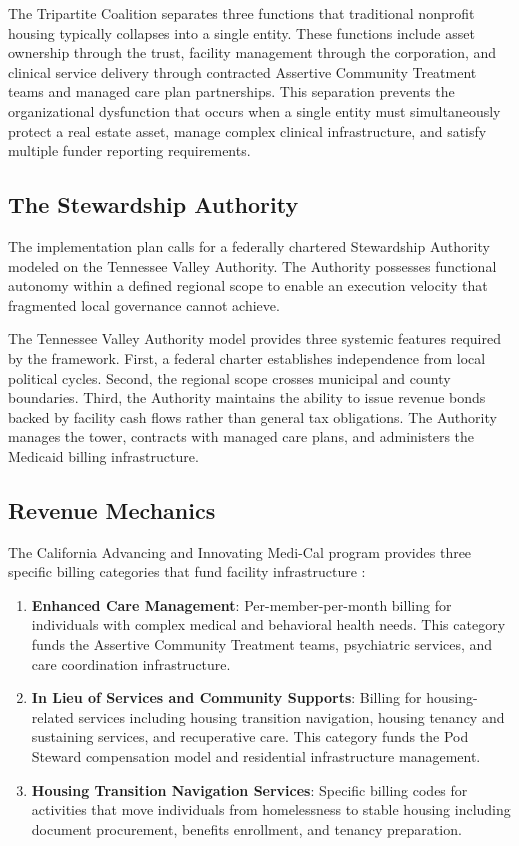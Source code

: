 \documentclass[12pt, letterpaper]{article}
\begin{document}
The Tripartite Coalition separates three functions that traditional nonprofit housing typically collapses into a single entity. These functions include asset ownership through the trust, facility management through the corporation, and clinical service delivery through contracted Assertive Community Treatment teams and managed care plan partnerships. This separation prevents the organizational dysfunction that occurs when a single entity must simultaneously protect a real estate asset, manage complex clinical infrastructure, and satisfy multiple funder reporting requirements.

\subsection{The Stewardship Authority}

The implementation plan calls for a federally chartered Stewardship Authority modeled on the Tennessee Valley Authority. The Authority possesses functional autonomy within a defined regional scope to enable an execution velocity that fragmented local governance cannot achieve.

The Tennessee Valley Authority model provides three systemic features required by the framework. First, a federal charter establishes independence from local political cycles. Second, the regional scope crosses municipal and county boundaries. Third, the Authority maintains the ability to issue revenue bonds backed by facility cash flows rather than general tax obligations. The Authority manages the tower, contracts with managed care plans, and administers the Medicaid billing infrastructure.

\subsection{Revenue Mechanics}

The California Advancing and Innovating Medi-Cal program provides three specific billing categories that fund facility infrastructure \citep{dhcs_calaim_2024, californiacoalition_2024}:

\begin{enumerate}
    \item \textbf{Enhanced Care Management}: Per-member-per-month billing for individuals with complex medical and behavioral health needs. This category funds the Assertive Community Treatment teams, psychiatric services, and care coordination infrastructure.
    \item \textbf{In Lieu of Services and Community Supports}: Billing for housing-related services including housing transition navigation, housing tenancy and sustaining services, and recuperative care. This category funds the Pod Steward compensation model and residential infrastructure management.
    \item \textbf{Housing Transition Navigation Services}: Specific billing codes for activities that move individuals from homelessness to stable housing including document procurement, benefits enrollment, and tenancy preparation.
\end{enumerate}
\end{document}

